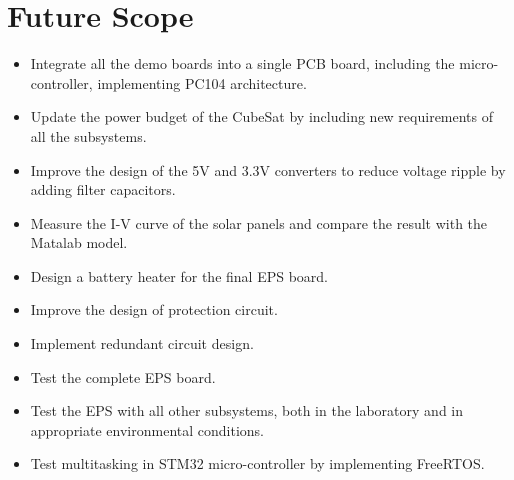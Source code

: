 \section{Future Scope}
\begin{itemize}
\item Integrate all the demo boards into a single PCB board, including the micro-controller, implementing PC104 architecture.
\item Update the power budget of the CubeSat by including new requirements of all the subsystems.
\item Improve the design of the 5V and 3.3V converters to reduce voltage ripple by adding filter capacitors.
\item Measure the I-V curve of the solar panels and compare the result with the Matalab model.
\item Design a battery heater for the final EPS board.
\item Improve the design of protection circuit.
\item Implement redundant circuit design.
\item Test the complete EPS board.
\item Test the EPS with all other subsystems, both in the laboratory and in appropriate environmental conditions.
\item Test multitasking in STM32 micro-controller by implementing FreeRTOS.
\end{itemize}